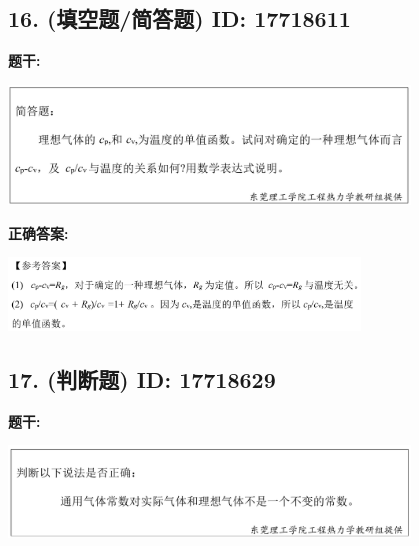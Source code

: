 \documentclass[12pt]{article}
\begin{document}
\vspace{0.5em}\hrulefill\vspace{1em}

\subsection*{16. (填空题/简答题) \small ID: 17718611}

\textbf{题干:}


\begin{center}\includegraphics[width=0.8\textwidth, height=0.25\textheight, keepaspectratio]{question_16_17718611/title_img_1.png}\end{center}

\textbf{正确答案:}

\begin{center}\includegraphics[width=0.7\textwidth, height=0.2\textheight, keepaspectratio]{question_16_17718611/correct_answer_1_img_1.png}\end{center}

\vspace{0.5em}\hrulefill\vspace{1em}

\subsection*{17. (判断题) \small ID: 17718629}

\textbf{题干:}


\begin{center}\includegraphics[width=0.8\textwidth, height=0.25\textheight, keepaspectratio]{question_17_17718629/title_img_1.png}\end{center}
\end{document}
